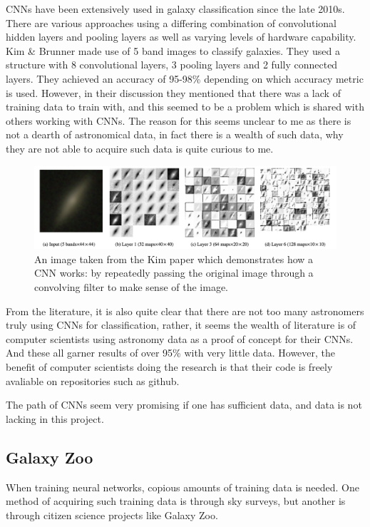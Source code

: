 \documentclass[a4paper,11pt]{article}
\begin{document}
CNNs have been extensively used in galaxy classification since the late 2010s. There are various approaches using a differing combination of convolutional hidden layers and pooling layers as well as varying levels of hardware capability. Kim \& Brunner \cite{kim_2016_stargalaxy} made use of 5 band images to classify galaxies. They used a structure with 8 convolutional layers, 3 pooling layers and 2 fully connected layers. They achieved an accuracy of 95-98\% depending on which accuracy metric is used. However, in their discussion they mentioned that there was a lack of training data to train with, and this seemed to be a problem which is shared with others working with CNNs. \cite{khalifanoureldeenm_2017_deep} \cite{aniyan_2017_classifying} The reason for this seems unclear to me as there is not a dearth of astronomical data, in fact there is a wealth of such data, why they are not able to acquire such data is quite curious to me.
\begin{figure}[ht]
\centering
\includegraphics[width=\textwidth]{CNNExample.png}
\caption{\label{fig:CNNExample}An image taken from the Kim paper which demonstrates how a CNN works: by repeatedly passing the original image through a convolving filter to make sense of the image.}
\end{figure}

From the literature, it is also quite clear that there are not too many astronomers truly using CNNs for classification, rather, it seems the wealth of literature is of computer scientists using astronomy data as a proof of concept for their CNNs. And these all garner results of over 95\% with very little data. However, the benefit of computer scientists doing the research is that their code is freely avaliable on repositories such as github.

The path of CNNs seem very promising if one has sufficient data, and data is not lacking in this project. 

\subsection{Galaxy Zoo}
When training neural networks, copious amounts of training data is needed. One method of acquiring such training data is through sky surveys, but another is through citizen science projects like Galaxy Zoo. \cite{lintott_2008_galaxy}
\end{document}
